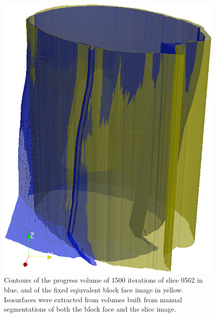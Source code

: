   \begin{figure}[htbp]
    \centering
    \includegraphics[width=\pagewidth]{Ch5/Figs/diagnostics/0562_contour.png}
    \caption{Contours of the progress volume of 1500 iterations of slice 0562 in blue, and of the fixed eqiuvalent block face image in yellow. Isosurfaces were extracted from volumes built from manual segmentations of both the block face and the slice image.}
    \label{fig:progress_contour}
  \end{figure}
      
